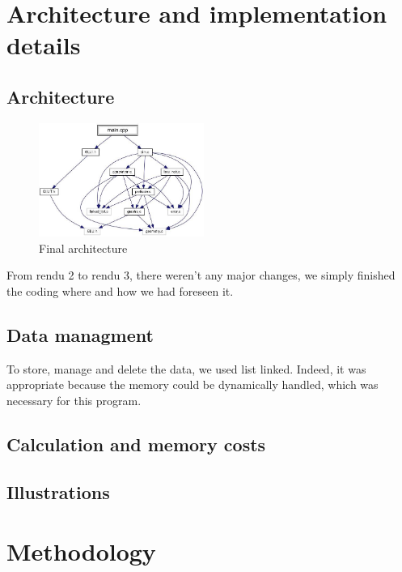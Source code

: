 \documentclass[a4paper]{article} %
\begin{document}
\begin{multicols*}{2}
\section{Architecture and implementation details}

\subsection{Architecture}
\begin{figure}[H]
\centering
\includegraphics[width=0.48\textwidth]{architecture.jpg}
\caption{Final architecture}
\end{figure}

From rendu 2 to rendu 3, there weren’t any major changes,
we simply finished the coding where and how we had foreseen it.


\subsection{Data managment}
To store, manage and delete the data, we used list linked.
Indeed, it was appropriate because the memory could be dynamically handled,
which was necessary for this program.

\subsection{Calculation and memory costs}

\subsection{Illustrations}


\section{Methodology}

\end{multicols*}
\end{document}

